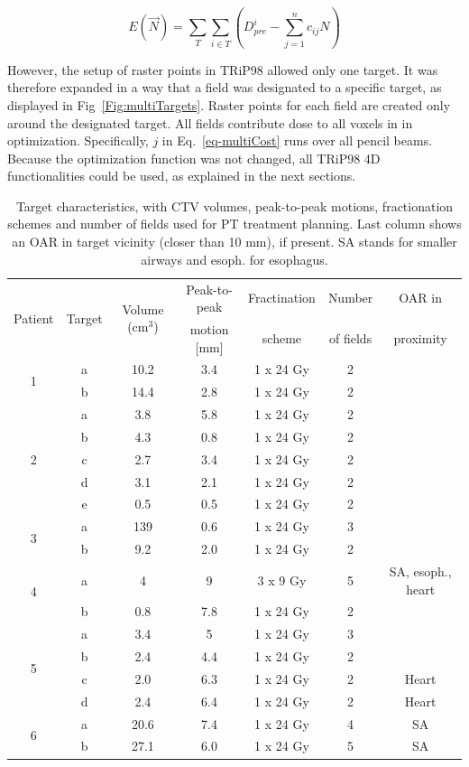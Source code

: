 \documentclass[type=dr, dr=rernat, accentcolor=tud7b,colorbacktitle, bigchapter, openright, twoside, 12pt ]{tudthesis}
\begin{document}
\begin{equation}
\label{eq-multiCost}
 E(\vec{N}) = \sum_{T} \sum_{i\in T} \left( D_{pre}^{i} -\sum_{j=1}^n c_{ij}N\right)
\end{equation}

However, the setup of raster points in TRiP98 allowed only one target. It was therefore expanded in a way that a field was designated to a specific target, as displayed in Fig~\ref{Fig:multiTargets}. 
Raster points for each field are created only around the designated target. All fields contribute dose to all voxels in in optimization. Specifically, $j$ in Eq.~\ref{eq-multiCost} runs over all pencil beams. 
Because the optimization function was not changed, 
all TRiP98 4D functionalities could be used, as explained in the next sections.


\begin{table}[H]
	\centering
	\caption{Target characteristics, with CTV volumes, peak-to-peak motions, fractionation schemes and number of fields used for PT treatment planning. Last column 
	shows an OAR in target vicinity (closer than 10 mm), if present. SA stands for smaller airways and esoph. for esophagus.}
	\begin{tabular}{c|c|c|c|c|c|c}
		\hline\hline
		\multirow{2}{*}{Patient} & \multirow{2}{*}{Target} & \multirow{2}{*}{Volume (cm$^3$)} & Peak-to-peak & Fractination & Number & OAR in \\
		 & & & motion [mm] & scheme & of fields & proximity \\
		\hline
		\multirow{2}{*}{1} & a & 10.2 & 3.4  & 1 x 24 Gy & 2 & \\
		 & b & 14.4 & 2.8 & 1 x 24 Gy  & 2 &  \\

		 
		 \hline
		 \multirow{5}{*}{2} & a & 3.8 & 5.8  & 1 x 24 Gy & 2 &\\
		  & b & 4.3 & 0.8  & 1 x 24 Gy& 2 &\\
		  & c & 2.7 & 3.4  & 1 x 24 Gy & 2&\\
		  & d & 3.1 & 2.1  & 1 x 24 Gy & 2&\\
		  & e & 0.5 & 0.5  & 1 x 24 Gy & 2&\\
		  \hline
		  \multirow{2}{*}{3} & a & 139 & 0.6 & 1 x 24 Gy & 3 \\
		 & b & 9.2 & 2.0  & 1 x 24 Gy & 2 \\
		 \hline
		 \multirow{2}{*}{4} & a & 4 & 9  & 3 x 9 Gy  & 5 & SA, esoph., heart \\
		 & b & 0.8 & 7.8  & 1 x 24 Gy & 2 \\
		 \hline
		 \multirow{4}{*}{5} & a & 3.4   & 5  & 1 x 24 Gy & 3 &  \\
				    & b & 2.4 & 4.4  & 1 x 24 Gy & 2 &\\
				    & c & 2.0 & 6.3  & 1 x 24 Gy& 2& Heart\\
				    & d & 2.4 & 6.4  & 1 x 24 Gy & 2 & Heart\\
		\hline	    
		\multirow{2}{*}{6} & a & 20.6 & 7.4 & 1 x 24 Gy & 4 & SA  \\
		 & b & 27.1 & 6.0  & 1 x 24 Gy &5 & SA  \\
		 

\end{tabular}
\end{table}
\end{document}
